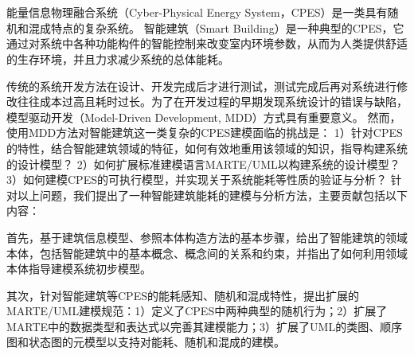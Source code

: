 \vspace{-2.5cm}
\chapter*{}
\vspace{-1cm}

\setlength{\baselineskip}{25pt}	
	能量信息物理融合系统（Cyber-Physical Energy System，CPES）是一类具有随机和混成特点的复杂系统。
	智能建筑（Smart Building）是一种典型的CPES，它通过对系统中各种功能构件的智能控制来改变室内环境参数，从而为人类提供舒适的生存环境，并且力求减少系统的总体能耗。
	
	传统的系统开发方法在设计、开发完成后才进行测试，测试完成后再对系统进行修改往往成本过高且耗时过长。为了在开发过程的早期发现系统设计的错误与缺陷，模型驱动开发（Model-Driven Development, MDD）方式具有重要意义。
	然而，使用MDD方法对智能建筑这一类复杂的CPES建模面临的挑战是：
	1）针对CPES的特性，结合智能建筑领域的特征，如何有效地重用该领域的知识，指导构建系统的设计模型？
	2）如何扩展标准建模语言MARTE/UML以构建系统的设计模型？
	3）如何建模CPES的可执行模型，并实现关于系统能耗等性质的验证与分析？
	针对以上问题，我们提出了一种智能建筑能耗的建模与分析方法，主要贡献包括以下内容：
	
	首先，基于建筑信息模型、参照本体构造方法的基本步骤，给出了智能建筑的领域本体，包括智能建筑中的基本概念、概念间的关系和约束，并指出了如何利用领域本体指导建模系统初步模型。
	
	其次，针对智能建筑等CPES的能耗感知、随机和混成特性，提出扩展的MARTE/UML建模规范：1）定义了CPES中两种典型的随机行为；2）扩展了MARTE中的数据类型和表达式以完善其建模能力；3）扩展了UML的类图、顺序图和状态图的元模型以支持对能耗、随机和混成的建模。


